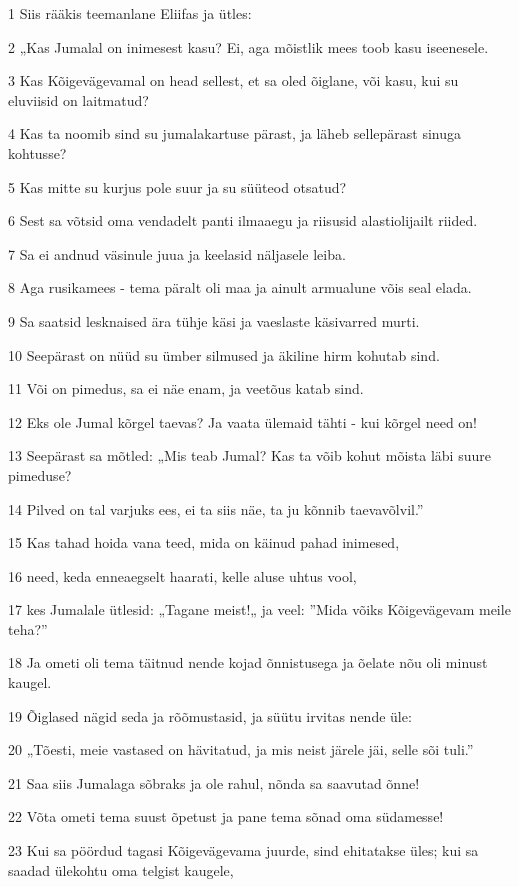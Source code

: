 \par 1 Siis rääkis teemanlane Eliifas ja ütles:
\par 2 „Kas Jumalal on inimesest kasu? Ei, aga mõistlik mees toob kasu iseenesele.
\par 3 Kas Kõigevägevamal on head sellest, et sa oled õiglane, või kasu, kui su eluviisid on laitmatud?
\par 4 Kas ta noomib sind su jumalakartuse pärast, ja läheb sellepärast sinuga kohtusse?
\par 5 Kas mitte su kurjus pole suur ja su süüteod otsatud?
\par 6 Sest sa võtsid oma vendadelt panti ilmaaegu ja riisusid alastiolijailt riided.
\par 7 Sa ei andnud väsinule juua ja keelasid näljasele leiba.
\par 8 Aga rusikamees - tema päralt oli maa ja ainult armualune võis seal elada.
\par 9 Sa saatsid lesknaised ära tühje käsi ja vaeslaste käsivarred murti.
\par 10 Seepärast on nüüd su ümber silmused ja äkiline hirm kohutab sind.
\par 11 Või on pimedus, sa ei näe enam, ja veetõus katab sind.
\par 12 Eks ole Jumal kõrgel taevas? Ja vaata ülemaid tähti - kui kõrgel need on!
\par 13 Seepärast sa mõtled: „Mis teab Jumal? Kas ta võib kohut mõista läbi suure pimeduse?
\par 14 Pilved on tal varjuks ees, ei ta siis näe, ta ju kõnnib taevavõlvil.”
\par 15 Kas tahad hoida vana teed, mida on käinud pahad inimesed,
\par 16 need, keda enneaegselt haarati, kelle aluse uhtus vool,
\par 17 kes Jumalale ütlesid: „Tagane meist!„ ja veel: ”Mida võiks Kõigevägevam meile teha?”
\par 18 Ja ometi oli tema täitnud nende kojad õnnistusega ja õelate nõu oli minust kaugel.
\par 19 Õiglased nägid seda ja rõõmustasid, ja süütu irvitas nende üle:
\par 20 „Tõesti, meie vastased on hävitatud, ja mis neist järele jäi, selle sõi tuli.”
\par 21 Saa siis Jumalaga sõbraks ja ole rahul, nõnda sa saavutad õnne!
\par 22 Võta ometi tema suust õpetust ja pane tema sõnad oma südamesse!
\par 23 Kui sa pöördud tagasi Kõigevägevama juurde, sind ehitatakse üles; kui sa saadad ülekohtu oma telgist kaugele,
